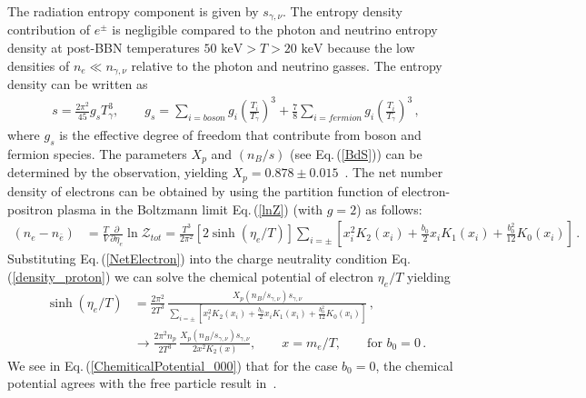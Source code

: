\documentclass[universe,article,submit,moreauthors,pdftex,a4paper]{Definitions/mdpi}
\newcommand{\keV}{\text{ keV}}
\newcommand{\req}[1]{Eq.\,(\ref{#1})}
\newcommand*{\xblue}{\color{black}}
\begin{document}
{\xblue The radiation entropy component is given by $s_{\gamma,\nu}$.} The entropy density contribution of $e^\pm$ is negligible compared to the photon and neutrino entropy density at post-BBN temperatures $50\keV>T>20\keV$ because the low densities of $n_e\ll n_{\gamma,\nu}$ relative to the photon and neutrino gasses. The entropy density can be written as~\cite{kolb1990early}
\begin{align}
s=\frac{2\pi^2}{45}g_sT_\gamma^3,\qquad g_s=\sum_{i=boson}g_i\left(\frac{T_i}{T_\gamma}\right)^3+\frac{7}{8}\sum_{i=fermion}g_i\left(\frac{T_i}{T_\gamma}\right)^3\,,
\end{align}
where $g_s$ is the effective degree of freedom that contribute from boson and fermion species. The parameters $X_p$ and $(n_B/s)$ (see \req{BdS}) can be determined by the observation, yielding $X_p=0.878\pm0.015$~\cite{ParticleDataGroup:2022pth}. The net number density of electrons can be obtained by using the partition function of electron-positron plasma in the Boltzmann limit \req{lnZ} (with $g=2$) as follows:
\begin{align}\label{NetElectron}
\left(n_e-n_{\bar e}\right)&=\frac{T}{V}\frac{\partial}{\partial \eta_{e}}\ln\mathcal{Z}_{tot}=\frac{T^3}{2\pi^2}\left[2\sinh{(\eta_{e}/T)}\right]\sum_{i=\pm}\left[x_i^2K_2(x_i)+\frac{b_0}{2}x_i K_1(x_i)+\frac{b^2_0}{12}K_0(x_i)\right]\,.
\end{align}
Substituting \req{NetElectron} into the charge neutrality condition \req{density_proton} we can solve the chemical potential of electron $\eta_e/T$ yielding
\begin{align}\label{ChemicalPotential}
\sinh{(\eta_{e}/T)}&=\frac{2\pi^2}{2T^3}\,\frac{X_p(n_B/s_{\gamma,\nu})s_{\gamma,\nu}}{\sum_{i=\pm}\left[x_i^2K_2(x_i)+\frac{b_0}{2}x_i K_1(x_i)+\frac{b^2_0}{12}K_0(x_i)\right]}\,,\\
&\longrightarrow\frac{2\pi^2n_p}{2T^3}\,\frac{X_p(n_B/s_{\gamma,\nu})s_{\gamma,\nu}}{2x^2K_2(x)},\qquad x=m_e/T,\qquad \mathrm{for}\,\,b_0=0\label{ChemiticalPotential_000}\,.
\end{align}
We see in \req{ChemiticalPotential_000} that for the case $b_0=0$, the chemical potential agrees with the free particle result in~\cite{Chris:2023abc}. 

\end{document}

